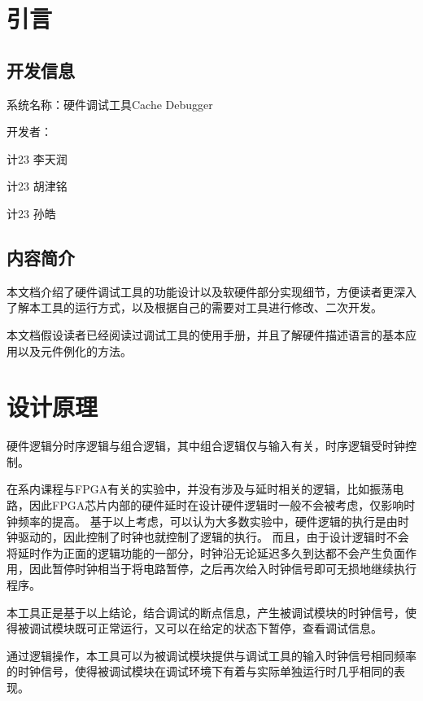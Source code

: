 \section{引言}
    \subsection{开发信息}
        系统名称：硬件调试工具Cache Debugger

        开发者：
        \begin{minipage}[t]{0.8\linewidth}
        计23 李天润

        计23 胡津铭

        计23 孙皓
        \end{minipage}

    \subsection{内容简介}
        本文档介绍了硬件调试工具的功能设计以及软硬件部分实现细节，方便读者更深入了解本工具的运行方式，以及根据自己的需要对工具进行修改、二次开发。

        本文档假设读者已经阅读过调试工具的使用手册，并且了解硬件描述语言的基本应用以及元件例化的方法。

\section{设计原理}
    硬件逻辑分时序逻辑与组合逻辑，其中组合逻辑仅与输入有关，时序逻辑受时钟控制。

    在系内课程与FPGA有关的实验中，并没有涉及与延时相关的逻辑，比如振荡电路，因此FPGA芯片内部的硬件延时在设计硬件逻辑时一般不会被考虑，仅影响时钟频率的提高。%
    基于以上考虑，可以认为大多数实验中，硬件逻辑的执行是由时钟驱动的，因此控制了时钟也就控制了逻辑的执行。%
    而且，由于设计逻辑时不会将延时作为正面的逻辑功能的一部分，时钟沿无论延迟多久到达都不会产生负面作用，因此暂停时钟相当于将电路暂停，之后再次给入时钟信号即可无损地继续执行程序。

    本工具正是基于以上结论，结合调试的断点信息，产生被调试模块的时钟信号，使得被调试模块既可正常运行，又可以在给定的状态下暂停，查看调试信息。

    通过逻辑操作，本工具可以为被调试模块提供与调试工具的输入时钟信号相同频率的时钟信号，使得被调试模块在调试环境下有着与实际单独运行时几乎相同的表现。

